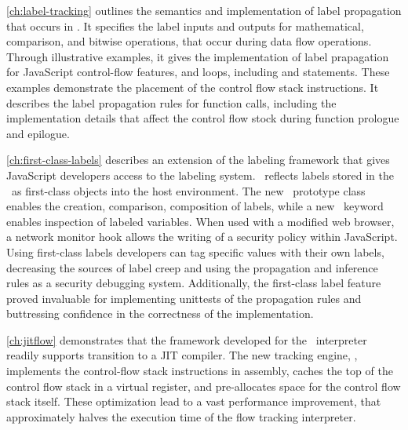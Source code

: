 \autoref{ch:label-tracking} outlines the semantics and implementation of label propagation that occurs in \FlowCore.
It specifies the label inputs and outputs for mathematical, comparison, and bitwise operations, that occur during data flow operations.
Through illustrative examples, it gives the implementation of label prapagation for JavaScript control-flow features,  and  loops, including  and  statements.
These examples demonstrate the placement of the control flow stack instructions.
It describes the label propagation rules for function calls, including the implementation details that affect the control flow stock during function prologue and epilogue.

\autoref{ch:first-class-labels} describes an extension of the labeling framework that gives JavaScript developers access to the labeling system.
\FlowCore\ reflects labels stored in the \FlowLabelRegistry\ as first-class objects into the host environment.
The new \FlowLabelObject\ prototype class enables the creation, comparison, composition of labels, while a new \mlabelof\ keyword enables inspection of labeled variables.
When used with a modified web browser, a network monitor hook allows the writing of a security policy within JavaScript.
Using first-class labels developers can tag specific values with their own labels, decreasing the sources of label creep and using the propagation and inference rules as a security debugging system.
Additionally, the first-class label feature proved invaluable for implementing unittests of the propagation rules and buttressing confidence in the correctness of the implementation.

\autoref{ch:jitflow} demonstrates that the framework developed for the \FlowCore\ interpreter readily supports transition to a JIT compiler.
The new tracking engine, \JitFlow, implements the control-flow stack instructions in assembly, caches the top of the control flow stack in a virtual register, and pre-allocates space for the control flow stack itself.
These optimization lead to a vast performance improvement, that approximately halves the execution time of the flow tracking interpreter.

